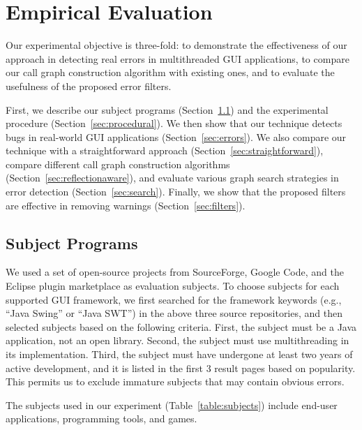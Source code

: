 
\tinystep
\section{Empirical Evaluation}
\label{sec:evaluation}

Our experimental objective is three-fold: to demonstrate the effectiveness
of our approach in detecting real errors in multithreaded GUI applications, to 
compare our call graph construction algorithm
with existing ones, and to evaluate the usefulness of the proposed 
error filters.  

First, we describe our subject programs (Section~\ref{sec:subjects}) and the experimental procedure (Section~\ref{sec:procedural}).
We then show that our technique detects bugs in real-world GUI applications (Section~\ref{sec:errors}).
We also compare our technique with
a straightforward approach (Section~\ref{sec:straightforward}),  compare
different call graph construction algorithms (Section~\ref{sec:reflectionaware}), and
evaluate various graph search strategies in error detection (Section~\ref{sec:search}).
 Finally, we show that the proposed filters are effective
in removing warnings (Section~\ref{sec:filters}). 



\subsection{Subject Programs}
\label{sec:subjects}


We used a set of open-source projects from SourceForge, Google Code,
and the Eclipse plugin
marketplace as evaluation subjects. To choose subjects for each supported GUI framework,
we first searched for the framework keywords (e.g., ``Java Swing'' or ``Java SWT'')
in the above three source repositories, and then selected subjects based on the following
criteria. First, the subject must be a Java application, not
an open library. Second, the subject must use multithreading in its implementation.
Third, the subject must have undergone at least two years of active development,
and it is listed in the first 3 result pages based on popularity. This permits us
to exclude immature subjects that may contain obvious errors.

The subjects used in our experiment (Table~\ref{table:subjects})
include end-user applications, programming tools, and games. 


